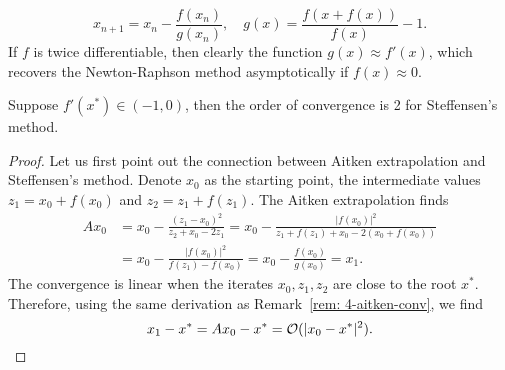 \begin{equation*}
       x_{n+1} = x_n - \frac{f(x_n)}{g(x_n)} ,\quad 
g(x)= \frac{f(x + f(x))}{f(x)} - 1.
\end{equation*}
If $f$ is twice differentiable, then clearly the function $g(x)\approx f'(x)$, which recovers the Newton-Raphson method asymptotically if $f(x)\approx 0$.
\begin{theorem}
    Suppose $f'(x^{\ast})\in (-1, 0)$, then the order of convergence is 2 for Steffensen's method.
\end{theorem}
\begin{proof}
    Let us first point out the connection between Aitken extrapolation and Steffensen's method. Denote $x_0$ as the starting point, the intermediate values $z_1 = x_0 +f (x_0)$ and $z_2 =z_1 +f(z_1)$. The Aitken extrapolation finds
    \begin{equation}
    \begin{aligned}
    A x_0 &= x_0 - \frac{(z_1 - x_0)^2}{z_2 + x_0 - 2 z_1 } = x_0 - \frac{|f(x_0)|^2}{z_1 + f(z_1) + x_0 - 2 (x_0 + f(x_0)) }     \\
    &=x_0 - \frac{|f(x_0)|^2}{f(z_1) - f(x_0)} = x_0 - \frac{f(x_0)}{g(x_0)} = x_1.
    \end{aligned}
    \end{equation}
    The convergence is linear when the iterates $x_0, z_1, z_2$ are close to the root $x^{\ast}$. Therefore, using the same derivation as Remark~\ref{rem: 4-aitken-conv}, we find 
    \begin{equation*}
       x_1 - x^{\ast} = A x_0 - x^{\ast} = \mathcal O( | x_0 - x^{\ast}|^2 ).
    \end{equation*}
\end{proof}

